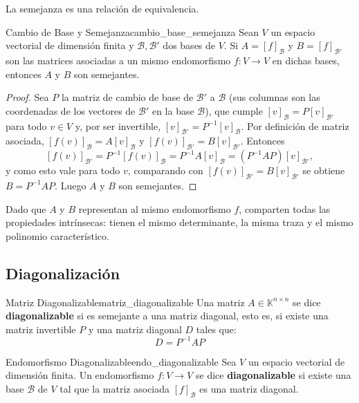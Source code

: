 \documentclass[11pt, a4paper]{article}
\begin{document}
\obs La semejanza es una relación de equivalencia.

\begin{teorema}{Cambio de Base y Semejanza}{cambio_base_semejanza}
Sean $V$ un espacio vectorial de dimensión finita y $\mathcal{B}, \mathcal{B}'$ dos bases de $V$.
Si $A = [f]_\mathcal{B}$ y $B = [f]_{\mathcal{B}'}$ son las matrices asociadas a un mismo endomorfismo $f: V \to V$ en dichas bases, entonces $A$ y $B$ son semejantes.
\end{teorema}

\begin{proof}
Sea $P$ la matriz de cambio de base de $\mathcal{B}'$ a $\mathcal{B}$ (sus columnas son las coordenadas de los vectores de $\mathcal{B}'$ en la base $\mathcal{B}$), que cumple $[v]_\mathcal{B} = P [v]_{\mathcal{B}'}$ para todo $v \in V$ y, por ser invertible, $[v]_{\mathcal{B}'} = P^{-1} [v]_\mathcal{B}$. Por definición de matriz asociada, $[f(v)]_\mathcal{B} = A [v]_\mathcal{B}$ y $[f(v)]_{\mathcal{B}'} = B [v]_{\mathcal{B}'}$. Entonces
\[
[f(v)]_{\mathcal{B}'} = P^{-1} [f(v)]_\mathcal{B} = P^{-1} A [v]_\mathcal{B} = (P^{-1} A P) [v]_{\mathcal{B}'},
\]
y como esto vale para todo $v$, comparando con $[f(v)]_{\mathcal{B}'} = B [v]_{\mathcal{B}'}$ se obtiene $B = P^{-1} A P$. Luego $A$ y $B$ son semejantes.
\end{proof}

\obs Dado que $A$ y $B$ representan al mismo endomorfismo $f$, comparten todas las propiedades intrínsecas: tienen el mismo determinante, la misma traza y el mismo polinomio característico.

\subsection{Diagonalización}

\begin{definicion}{Matriz Diagonalizable}{matriz_diagonalizable}
Una matriz $A \in \mathbb{K}^{n \times n}$ se dice \textbf{diagonalizable} si es semejante a una matriz diagonal, esto es, si existe una matriz invertible $P$ y una matriz diagonal $D$ tales que:
\[ D = P^{-1} A P \]
\end{definicion}

\begin{definicion}{Endomorfismo Diagonalizable}{endo_diagonalizable}
Sea $V$ un espacio vectorial de dimensión finita. Un endomorfismo $f: V \to V$ se dice \textbf{diagonalizable} si existe una base $\mathcal{B}$ de $V$ tal que la matriz asociada $[f]_\mathcal{B}$ es una matriz diagonal.
\end{definicion}
\end{document}
